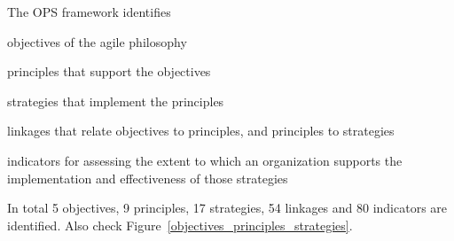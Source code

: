 
The OPS framework identifies 
\begin{inparaenum} [a\upshape)]
\item objectives of the agile philosophy
\item principles that support the objectives
\item strategies that implement the principles
\item linkages that relate objectives to
principles, and principles to strategies
\item indicators for assessing the extent to which an organization supports the implementation and effectiveness of those strategies
\end{inparaenum}


In total 5 objectives, 9 principles, 17 strategies, 54 linkages and 80 indicators are identified. Also check Figure~\ref{objectives_principles_strategies}.

